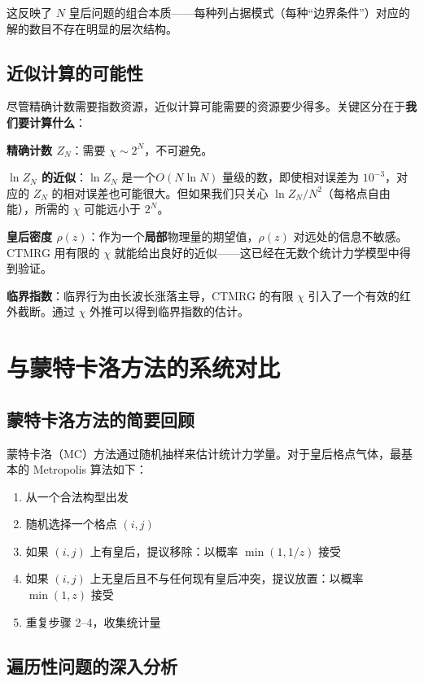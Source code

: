 \documentclass[12pt,a4paper]{ctexart}
\begin{document}
这反映了 $N$ 皇后问题的组合本质——每种列占据模式（每种``边界条件''）对应的解的数目不存在明显的层次结构。

\subsection{近似计算的可能性}

尽管精确计数需要指数资源，近似计算可能需要的资源要少得多。关键区分在于\textbf{我们要计算什么}：

\textbf{精确计数 $Z_N$}：需要 $\chi \sim 2^N$，不可避免。

\textbf{$\ln Z_N$ 的近似}：$\ln Z_N$ 是一个$O(N \ln N)$ 量级的数，即使相对误差为 $10^{-3}$，对应的 $Z_N$ 的相对误差也可能很大。但如果我们只关心 $\ln Z_N / N^2$（每格点自由能），所需的 $\chi$ 可能远小于 $2^N$。

\textbf{皇后密度 $\rho(z)$}：作为一个\textbf{局部}物理量的期望值，$\rho(z)$ 对远处的信息不敏感。CTMRG 用有限的 $\chi$ 就能给出良好的近似——这已经在无数个统计力学模型中得到验证。

\textbf{临界指数}：临界行为由长波长涨落主导，CTMRG 的有限 $\chi$ 引入了一个有效的红外截断。通过 $\chi$ 外推可以得到临界指数的估计。


\section{与蒙特卡洛方法的系统对比}

\subsection{蒙特卡洛方法的简要回顾}

蒙特卡洛（MC）方法通过随机抽样来估计统计力学量。对于皇后格点气体，最基本的 Metropolis 算法如下：

\begin{enumerate}
\item 从一个合法构型出发
\item 随机选择一个格点 $(i,j)$
\item 如果 $(i,j)$ 上有皇后，提议移除：以概率 $\min(1, 1/z)$ 接受
\item 如果 $(i,j)$ 上无皇后且不与任何现有皇后冲突，提议放置：以概率 $\min(1, z)$ 接受
\item 重复步骤 2--4，收集统计量
\end{enumerate}

\subsection{遍历性问题的深入分析}
\end{document}
